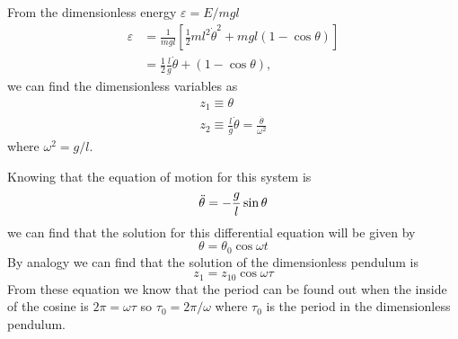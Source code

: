 \subsection{}
From the dimensionless energy $\varepsilon=E/mgl$ 
\begin{align*}
    \varepsilon&=\frac{1}{mgl}\left[\frac{1}{2}ml^2\dot{\theta}^2+mgl(1-\cos\theta)\right]\\
    &=\frac{1}{2}\frac{l}{g}\dot{\theta} + (1-\cos\theta),
\end{align*}
we can find the dimensionless variables as
\begin{align*}
    z_1\equiv\theta\\
    z_2\equiv\frac{l}{g}\dot{\theta}=\frac{\dot{\theta}}{\omega^2}
\end{align*}
where $\omega^2=g/l$.

Knowing that the equation of motion for this system is 
\begin{equation}
    \Ddot{\theta}=-\frac{g}{l}\sin\theta
    \label{eq:pendEqMotion}
\end{equation}
we can find that the solution for this differential equation will be given by
\begin{equation*}
\theta = \theta_0\cos{\omega t}  
\end{equation*}
By analogy we can find that the solution of the dimensionless pendulum is
\begin{equation*}
z_1 = z_{10}\cos{\omega\tau}  
\end{equation*}
From these equation we know that the period can be found out when the inside of the cosine is $2\pi=\omega \tau$ so $\tau_0=2\pi/\omega$ where $\tau_0$ is the period in the dimensionless pendulum. 

\subsection{}

